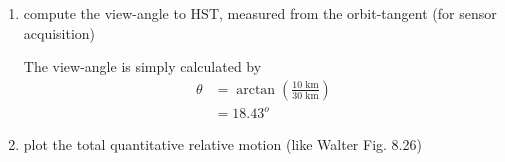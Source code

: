 \documentclass[onecolumn,10pt]{jhwhw}
\begin{document}
\begin{enumerate}
\item compute the view-angle to HST, measured from the orbit-tangent (for sensor acquisition)

The view-angle is simply calculated by
\begin{align*}
\theta &= \arctan{\left(\frac{10 \mbox{ km}}{30 \mbox{ km}} \right)} \\
       &= 18.43^o
\end{align*}
\item plot the total quantitative relative motion (like Walter Fig. 8.26)
\end{enumerate}
\end{document}
